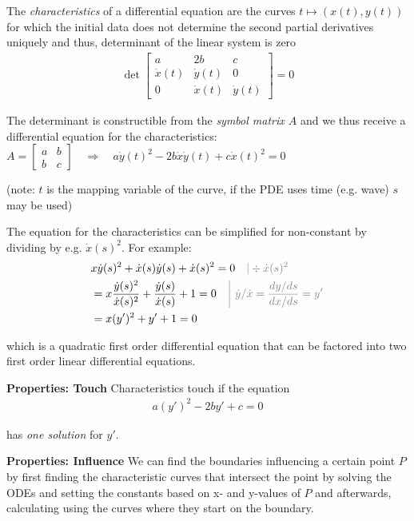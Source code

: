 The \emph{characteristics} of a differential equation are the curves $t\mapsto(x(t),y(t))$ for which the initial data
does not determine the second partial derivatives uniquely and thus, determinant of the linear system is zero
\begin{align*}
    \det
    \begin{bmatrix}
        a & 2b & c \\
        \dot{x}(t) & \dot{y}(t) & 0 \\
        0 & \dot{x}(t) & \dot{y}(t)
    \end{bmatrix}
    = 0
\end{align*}

The determinant is constructible from the \emph{symbol matrix $A$} and we thus receive a differential equation for the characteristics:
\colorbox{shadecolor}{$
    \displaystyle
    A = \begin{bmatrix}
        a & b \\
        b & c
    \end{bmatrix}
    \quad\Rightarrow\quad
    a\dot{y}(t)^2 - 2b\dot{x}\dot{y}(t) + c\dot{x}(t)^2 = 0
$}

(note: $t$ is the mapping variable of the curve, if the PDE uses time (e.g. wave) $s$ may be used)

The equation for the characteristics can be simplified for non-constant by dividing by e.g. $\dot{x}(s)^2$. For example:
\begin{align*}
    & x\dot{y}(s)^{2}+\dot{x}(s)\dot{y}(s)+\dot{x}(s)^{2}=0\quad{\color{gray}|\div \dot{x}(s)^2} \\
    & = x\frac{\dot{y}(s)^{2}}{\dot{x}(s)^{2}}+\frac{\dot{y}(s)}{\dot{x}(s)}+1=0
    \quad {\color{gray} \left|\ \dot{y}/\dot{x} = \frac{dy/ds}{dx/ds} = y' \right.} \\
    & = x(y')^2 + y' + 1 = 0
\end{align*}

which is a quadratic first order differential equation that can be factored into two first order linear differential equations.

\textbf{Properties: Touch} Characteristics touch if the equation
\begin{align*}
    a(y')^2 - 2by' + c = 0
\end{align*}

has \emph{one solution} for $y'$.

\textbf{Properties: Influence} We can find the boundaries influencing a certain point $P$ by first finding the
characteristic curves that intersect the point by solving the ODEs and setting the constants based on x- and y-values of
$P$ and afterwards, calculating using the curves where they start on the boundary.
